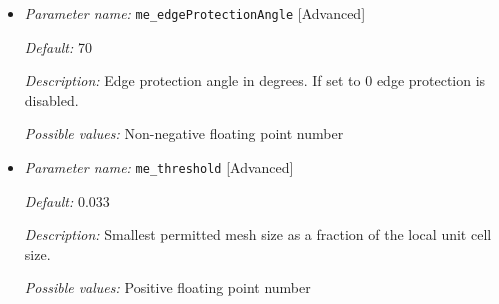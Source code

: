 \begin{itemize}[itemsep=0.8em, parsep=0.3em]
	
	{\it Default:} FALSE
	
	{\it Description:} Parameter specifying if a volume mesh is also required. Set to TRUE to obtain a volume mesh in addition to the surface triangulation, otherwise only a surface triangulation is generated.
	
	{\it Possible values:} Boolean value (TRUE or FALSE)
	
	\item {\it Parameter name:} {\tt me\_edgeProtectionAngle}  \hfill [Advanced]
	\label{parameters:me_edgeProtectionAngle}
	
	
	{\it Default:} 70
	
	{\it Description:} Edge protection angle in degrees. If set to 0 edge protection is disabled.
	
	{\it Possible values:}  Non-negative floating point number
	
	\item {\it Parameter name:} {\tt me\_threshold} \hfill [Advanced]
	\label{parameters:me_threshold}
	
	
	{\it Default:} 0.033
	
	{\it Description:} Smallest permitted mesh size as a fraction of the local unit cell size.
	
	{\it Possible values:} Positive floating point number

\end{itemize}

